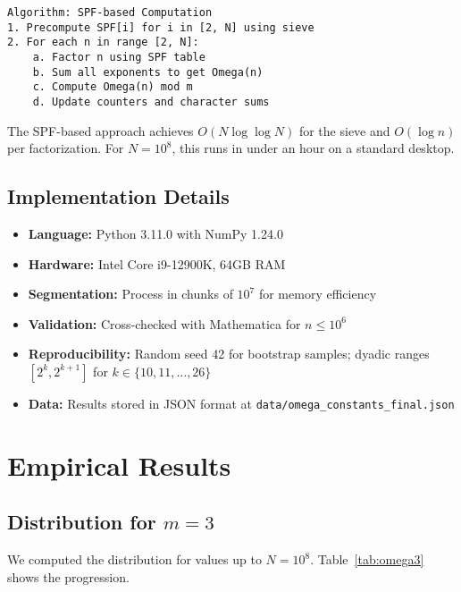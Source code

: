 \documentclass[12pt]{article}
\theoremstyle{definition}
\theoremstyle{remark}
\begin{document}
\begin{verbatim}
Algorithm: SPF-based Computation
1. Precompute SPF[i] for i in [2, N] using sieve
2. For each n in range [2, N]:
    a. Factor n using SPF table
    b. Sum all exponents to get Omega(n)
    c. Compute Omega(n) mod m
    d. Update counters and character sums
\end{verbatim}

The SPF-based approach achieves $O(N \log \log N)$ for the sieve and $O(\log n)$ per factorization. For $N = 10^8$, this runs in under an hour on a standard desktop.

\subsection{Implementation Details}

\begin{itemize}
\item \textbf{Language:} Python 3.11.0 with NumPy 1.24.0
\item \textbf{Hardware:} Intel Core i9-12900K, 64GB RAM
\item \textbf{Segmentation:} Process in chunks of $10^7$ for memory efficiency
\item \textbf{Validation:} Cross-checked with Mathematica for $n \leq 10^6$
\item \textbf{Reproducibility:} Random seed 42 for bootstrap samples; dyadic ranges $[2^k, 2^{k+1}]$ for $k \in \{10, 11, \ldots, 26\}$
\item \textbf{Data:} Results stored in JSON format at \texttt{data/omega\_constants\_final.json}
\end{itemize}

\section{Empirical Results}

\subsection{Distribution for $m = 3$}

We computed the distribution for values up to $N = 10^8$. Table~\ref{tab:omega3} shows the progression.
\end{document}

